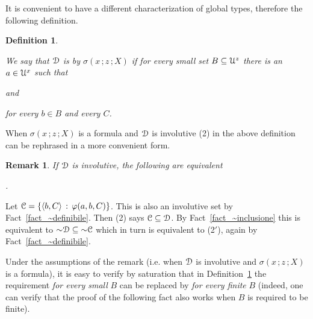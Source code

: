 \documentclass{amsproc}
\makeatletter
\newcounter{thm}
\theoremstyle{mio}
\newtheorem{definition}[thm]{Definition}\tcolorboxenvironment{definition}{mythm}
\newtheorem{remark}[thm]{Remark}\tcolorboxenvironment{remark}{mythm}
\providecommand{\proofNameStyle}{\bfseries}
\renewenvironment{proof}[1][\proofname]{\par
  \pushQED{\qed}%
  \normalfont%
  \trivlist
  \item[\hskip\labelsep
        \proofNameStyle
    #1\@addpunct{.}]\ignorespaces
}{%
  \popQED\endtrivlist\@endpefalse
}
\renewcommand*{\emph}[1]{%
   \smash{\tikz[baseline]\node[rectangle, fill=teal!25, rounded corners, inner xsep=0.5ex, inner ysep=0.2ex, anchor=base, minimum height = 2.7ex]{\strut #1};}}
\makeatother
\begin{document}
It is convenient to have a different characterization of global types, therefore  the following definition.

\begin{definition}\label{def_approx_X}\strut
  We say that ${\EuScript D}$ is \emph{approximable\/} by $\sigma(x\,;z\,;X)$ if for every small set $B\subseteq{\EuScript U}^z$ there is an $a\in{\EuScript U}^x$ such that\smallskip

  \quad and\smallskip

  \hfill for every $b\in B$ and every $C$.\smallskip
\end{definition}

When $\sigma(x\,;z\,;X)$ is a formula and  ${\EuScript D}$ is involutive (2) in the above definition can be rephrased in a more convenient form.

\begin{remark}\label{rem_approx}
  If ${\EuScript D}$ is involutive, the following are equivalent\smallskip

  \smallskip

  .
\end{remark}

\begin{proof}
  Let ${\EuScript C}=\{\langle b,C\rangle\,:\,\varphi(a,b,C)\}$.
  This is also an involutive set by Fact~\ref{fact_~definibile}.
  Then (2) says ${\EuScript C}\subseteq{\EuScript D}$.
  By Fact~\ref{fact_~inclusione} this is equivalent to ${\sim}{\EuScript D}\subseteq{\sim}{\EuScript C}$ which in turn is equivalent to (2$'$), again by Fact~\ref{fact_~definibile}.
\end{proof}

Under the assumptions of the remark (i.e. when ${\EuScript D}$ is involutive and $\sigma(x\,;z\,;X)$ is a formula), it is easy to verify by saturation that in Definition~\ref{def_approx_X} the requirement \textit{for every small\/} $B$ can be replaced by \textit{for every finite\/} $B$ (indeed, one can verify that the proof of the following fact also works when $B$ is required to be finite).
\end{document}
